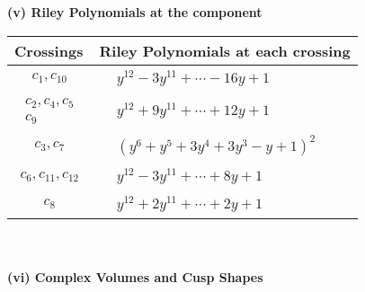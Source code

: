 \documentclass[1p]{elsarticle_modified}
\theoremstyle{definition}
\begin{document}
\newpage\renewcommand{\arraystretch}{1}
\flushleft \textbf{(v) Riley Polynomials at the component}\newline \\
\begin{tabular}{m{50pt}|m{274pt}}
Crossings & \hspace{64pt}Riley Polynomials at each crossing \\
\hline $$\begin{aligned}c_{1},c_{10}\end{aligned}$$&$\begin{aligned}
&y^{12}-3 y^{11}+\cdots-16 y+1
\end{aligned}$\\
\hline $$\begin{aligned}c_{2},c_{4},c_{5}\\c_{9}\end{aligned}$$&$\begin{aligned}
&y^{12}+9 y^{11}+\cdots+12 y+1
\end{aligned}$\\
\hline $$\begin{aligned}c_{3},c_{7}\end{aligned}$$&$\begin{aligned}
&(y^6+y^5+3 y^4+3 y^3- y+1)^2
\end{aligned}$\\
\hline $$\begin{aligned}c_{6},c_{11},c_{12}\end{aligned}$$&$\begin{aligned}
&y^{12}-3 y^{11}+\cdots+8 y+1
\end{aligned}$\\
\hline $$\begin{aligned}c_{8}\end{aligned}$$&$\begin{aligned}
&y^{12}+2 y^{11}+\cdots+2 y+1
\end{aligned}$\\
\hline
\end{tabular}\\~\\
\newpage\flushleft \textbf{(vi) Complex Volumes and Cusp Shapes}
\end{document}
